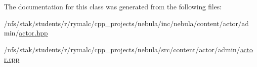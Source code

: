 The documentation for this class was generated from the following files:\begin{DoxyCompactItemize}
\item 
/nfs/stak/students/r/rymalc/cpp\_\-projects/nebula/inc/nebula/content/actor/admin/\hyperlink{admin_2actor_8hpp}{actor.hpp}\item 
/nfs/stak/students/r/rymalc/cpp\_\-projects/nebula/src/content/actor/admin/\hyperlink{admin_2actor_8cpp}{actor.cpp}\end{DoxyCompactItemize}
